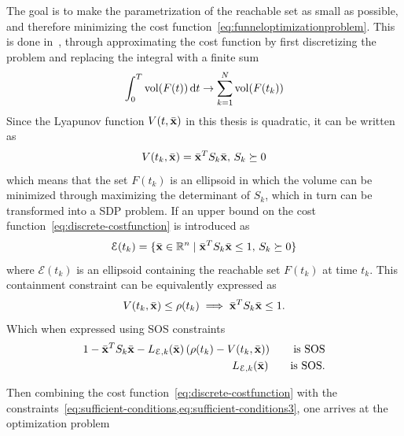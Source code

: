 The goal is to make the parametrization of the reachable set as small as
possible, and therefore minimizing the cost
function~\cref{eq:funneloptimizationproblem}. This is done
in~\cite{majumdarFunnelLibrariesRealtime2017}, through approximating the cost
function by first discretizing the problem and replacing the integral with a
finite sum
\begin{equation}
  \int_{0}^{T} \operatorname{vol}(F(t))\, \mathrm{d}t \rightarrow \sum_{k=1}^{N} \operatorname{vol}(F(t_{k})) \label{eq:discrete-costfunction}
\end{equation}
Since the Lyapunov function \(V(t,\bar{\mathbf{x}})\) in this thesis is quadratic,
it can be written as
\begin{equation}
  V(t_{k}, \bar{\mathbf{x}}) = {\bar{\mathbf{x}}}^{T}S_{k}\bar{\mathbf{x}}, \, S_{k} \succeq 0
\end{equation}
which means that the set \(F(t_{k})\) is an ellipsoid in which the volume can be
minimized through maximizing the determinant of \(S_{k}\), which in turn can be
transformed into a \ac{SDP} problem. If an upper bound on the cost
function~\cref{eq:discrete-costfunction} is introduced as
\begin{equation}
  \mathcal{E} (t_{k}) = \lbrace\bar{\mathbf{x}} \in \mathbb{R}^n \mid {\bar{\mathbf{x}}}^{T}S_{k}\bar{\mathbf{x}} \leq 1, \, S_{k} \succeq 0\rbrace
\end{equation}
where \( \mathcal{E} ( t_{k} ) \) is an ellipsoid containing the reachable set
\( F ( t_{k} ) \) at time \( t_{k} \). This containment constraint can be
equivalently expressed as
\begin{equation}
  V ( t_{k}, \bar{\mathbf{x}} ) \leq \rho(t_{k})  \implies {\bar{\mathbf{x}}}^{T}S_{k}\bar{\mathbf{x}} \leq 1.
\end{equation}
Which when expressed using \ac{SOS} constraints
\begin{align}
  1 - {\bar{\mathbf{x}}}^{T}S_{k}\bar{\mathbf{x}} - L_{\mathcal{E},k}(\bar{\mathbf{x}})\left( \rho(t_{k}) - V(t_{k}, \bar{\mathbf{x}}) \right)  \qquad \text{is SOS}& \\
  L_{\mathcal{E},k}(\bar{\mathbf{x}}) \qquad \text{is SOS.}& \\
\end{align}

Then combining the cost function~\cref{eq:discrete-costfunction} with the
constraints~\cref{eq:sufficient-conditions,eq:sufficient-conditions3}, one
arrives at the optimization problem

